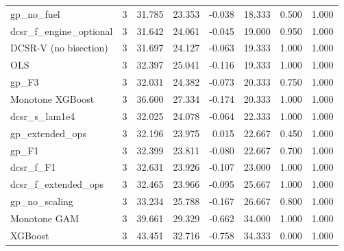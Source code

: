 \begin{tabular}{lrrrrrrr}
gp\_no\_fuel & 3 & 31.785 & 23.353 & -0.038 & 18.333 & 0.500 & 1.000 \\
dcsr\_f\_engine\_optional & 3 & 31.642 & 24.061 & -0.045 & 19.000 & 0.950 & 1.000 \\
DCSR-V (no bisection) & 3 & 31.697 & 24.127 & -0.063 & 19.333 & 1.000 & 1.000 \\
OLS & 3 & 32.397 & 25.041 & -0.116 & 19.333 & 1.000 & 1.000 \\
gp\_F3 & 3 & 32.031 & 24.382 & -0.073 & 20.333 & 0.750 & 1.000 \\
Monotone XGBoost & 3 & 36.600 & 27.334 & -0.174 & 20.333 & 1.000 & 1.000 \\
dcsr\_s\_lam1e4 & 3 & 32.025 & 24.078 & -0.064 & 22.333 & 1.000 & 1.000 \\
gp\_extended\_ops & 3 & 32.196 & 23.975 & 0.015 & 22.667 & 0.450 & 1.000 \\
gp\_F1 & 3 & 32.399 & 23.811 & -0.080 & 22.667 & 0.700 & 1.000 \\
dcsr\_f\_F1 & 3 & 32.631 & 23.926 & -0.107 & 23.000 & 1.000 & 1.000 \\
dcsr\_f\_extended\_ops & 3 & 32.465 & 23.966 & -0.095 & 25.667 & 1.000 & 1.000 \\
gp\_no\_scaling & 3 & 33.234 & 25.788 & -0.167 & 26.667 & 0.800 & 1.000 \\
Monotone GAM & 3 & 39.661 & 29.329 & -0.662 & 34.000 & 1.000 & 1.000 \\
XGBoost & 3 & 43.451 & 32.716 & -0.758 & 34.333 & 0.000 & 1.000 \\
\bottomrule
\end{tabular}

